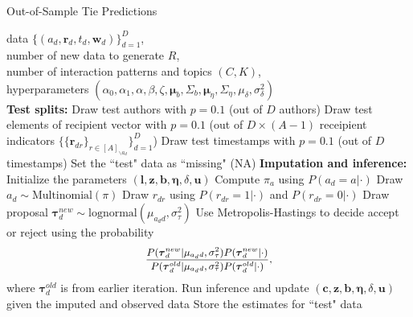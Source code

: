 \documentclass{article}
\begin{document}
 	   \begin{algorithm}[H]
 	   	\caption{Out-of-Sample Tie Predictions}
 	   	\label{alg:PPE}
 	   	\begin{algorithmic}
 	   		 data $ \{ (a_d, \boldsymbol{r}_d, t_d,  \boldsymbol{w}_d)\}_{d=1}^D$, \\
 	   		number of new data to generate $R$,\\
 	   		number of interaction patterns and topics $(C, K)$,\\
 	   		hyperparameters $(\alpha_0, \alpha_1, \alpha, \beta, \zeta, \boldsymbol{\mu}_b, \Sigma_b, \boldsymbol{\mu}_\eta, \Sigma_\eta, {\mu}_\delta,\sigma^2_\delta)$\\
 	   		\vskip 0.1in
 	   		\textbf{Test splits:}	
 	   		\STATE Draw test authors with $p=0.1$ (out of $D$ authors) 
 	   		\STATE Draw test elements of recipient vector 
 	   		with $p=0.1$ (out of $D\times (A-1)$ receipient indicators $\{\{\boldsymbol{r}_{dr}\}_{r\in [A]_{\backslash a_d}}\}_{d=1}^D$)
 	   		\STATE Draw test timestamps with $p=0.1$  (out of $D$ timestamps) 
 	   		\STATE Set the ``test" data as ``missing" (NA)
 	   		\vskip 0.1in
 	   		\textbf{Imputation and inference:}	
 	   		\STATE Initialize the parameters $(\boldsymbol{l}, \boldsymbol{z}, \boldsymbol{b}, \boldsymbol{\eta},\delta, \boldsymbol{u})$
 	   		\STATE Compute $\pi_{a} $ using $P(a_d= a | \cdot)$
 	   		\ENDFOR
 	   		\STATE Draw $a_d \sim \mbox{Multinomial}(\pi)$
 	   		\ENDIF
 	   		\STATE Draw $r_{dr}$ using $P(r_{dr}= 1 | \cdot)$ and $P(r_{dr}= 0| \cdot)$ 
 	   		\ENDIF
 	   		\ENDFOR
 	   		\STATE Draw proposal $\boldsymbol{\tau}^{new}_d \sim \mbox{lognormal}(\mu_{a_dd}, \sigma^2_\tau)$
 	   		\STATE Use Metropolis-Hastings to decide accept or reject using the probability
 	   		    \begin{equation*}
 	   		    \footnotesize
\frac{P(\boldsymbol{\tau}^{new}_d|\mu_{a_dd}, \sigma^2_\tau) P(\boldsymbol{\tau}^{new}_d| \cdot)}{P(\boldsymbol{\tau}^{old}_d|\mu_{a_dd}, \sigma^2_\tau) P(\boldsymbol{\tau}^{old}_d| \cdot)},
 	   		    \end{equation*}
 	   		    where $\boldsymbol{\tau}^{old}_d$ is from earlier iteration.
 	   		\ENDIF
 	   		\STATE Run inference and update $(\boldsymbol{c}, \boldsymbol{z}, \boldsymbol{b}, \boldsymbol{\eta},\delta, \boldsymbol{u})$ given the imputed and observed data
 	   		\ENDFOR
 	   		\STATE Store the estimates for ``test" data
 	   		\ENDFOR
 	   	\end{algorithmic}
 	   \end{algorithm}
 	   
\end{document}
